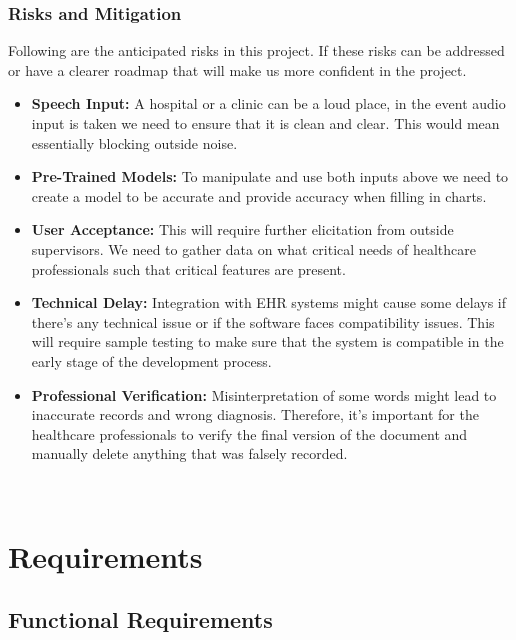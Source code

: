 \documentclass[12pt]{article}
\begin{document}
\subsubsection{Risks and Mitigation}

Following are the anticipated risks in this project. If these risks can be addressed or have a clearer roadmap that will make us more confident in the project. 

\begin{itemize}
  \item \textbf{Speech Input:} A hospital or a clinic can be a loud place, in the event audio input is taken we need to ensure that it is clean and clear. This would mean essentially blocking outside noise. 
  \item \textbf{Pre-Trained Models:} To manipulate and use both inputs above we need to create a model to be accurate and provide accuracy when filling in charts. 
  \item \textbf{User Acceptance:} This will require further elicitation from outside supervisors. We need to gather data on what critical needs of healthcare professionals such that critical features are present.
  \item \textbf{Technical Delay:} Integration with EHR systems might cause some delays if there's any technical issue or if the software faces compatibility issues. This will require sample testing to make sure that the system is compatible in the early stage of the development process.
  \item \textbf{Professional Verification:} Misinterpretation of some words might lead to inaccurate records and wrong diagnosis. Therefore, it's important for the healthcare professionals to verify the final version of the document and manually delete anything that was falsely recorded. 
\end{itemize}

~\newpage

\section{Requirements} \label{sec_Requirements}


\subsection{Functional Requirements} \label{sec_FunctionalRequirements}
\end{document}
